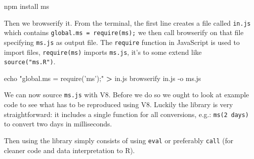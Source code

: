 \documentclass[10pt,]{krantz}
\makeatletter
\newenvironment{Shaded}{\begin{snugshade}}{\end{snugshade}}
\newcommand{\BuiltInTok}[1]{#1}
\newcommand{\CommentTok}[1]{\textcolor[rgb]{0.37,0.37,0.37}{\textit{#1}}}
\newcommand{\ExtensionTok}[1]{#1}
\newcommand{\KeywordTok}[1]{\textcolor[rgb]{0.27,0.27,0.27}{\textbf{#1}}}
\newcommand{\NormalTok}[1]{#1}
\newcommand{\OperatorTok}[1]{\textcolor[rgb]{0.43,0.43,0.43}{\textbf{#1}}}
\newcommand{\StringTok}[1]{\textcolor[rgb]{0.5,0.5,0.5}{#1}}
\newenvironment{kframe}{%
\medskip{}
\setlength{\fboxsep}{.8em}
 \def\at@end@of@kframe{}%
 \ifinner\ifhmode%
  \def\at@end@of@kframe{\end{minipage}}%
  \begin{minipage}{\columnwidth}%
 \fi\fi%
 \def\FrameCommand##1{\hskip\@totalleftmargin \hskip-\fboxsep
 \colorbox{shadecolor}{##1}\hskip-\fboxsep
     \hskip-\linewidth \hskip-\@totalleftmargin \hskip\columnwidth}%
 \MakeFramed {\advance\hsize-\width
   \@totalleftmargin\z@ \linewidth\hsize
   \@setminipage}}%
 {\par\unskip\endMakeFramed%
 \at@end@of@kframe}
\renewenvironment{Shaded}{\begin{kframe}}{\end{kframe}}
\makeatother
\begin{document}
\begin{Shaded}
\begin{Highlighting}[]
\ExtensionTok{npm}\NormalTok{ install ms}
\end{Highlighting}
\end{Shaded}

Then we browserify it. From the terminal, the first line creates a file called \texttt{in.js} which contains \texttt{global.ms\ =\ require(\textquotesingle{}ms\textquotesingle{});} we then call browserify on that file specifying \texttt{ms.js} as output file. The \texttt{require} function in JavaScript is used to import files, \texttt{require(\textquotesingle{}ms\textquotesingle{})} imports \texttt{ms.js}, it's to some extend like \texttt{source("ms.R")}.

\begin{Shaded}
\begin{Highlighting}[]
\BuiltInTok{echo} \StringTok{"global.ms = require('ms');"} \OperatorTok{>}\NormalTok{ in.js}
\ExtensionTok{browserify}\NormalTok{ in.js -o ms.js}
\end{Highlighting}
\end{Shaded}

We can now source \texttt{ms.js} with V8. Before we do so we ought to look at example code to see what has to be reproduced using V8. Luckily the library is very straightforward: it includes a single function for all conversions, e.g.: \texttt{ms(\textquotesingle{}2\ days\textquotesingle{})} to convert two days in milliseconds.

\begin{Shaded}
\end{Shaded}

Then using the library simply consists of using \texttt{eval} or preferably \texttt{call} (for cleaner code and data interpretation to R).

\begin{Shaded}
\end{Shaded}
\end{document}
